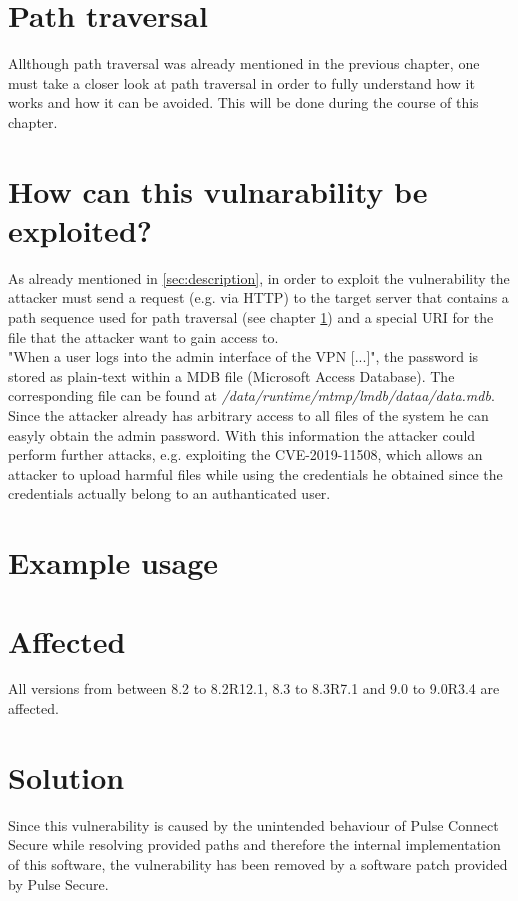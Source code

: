 \section{Path traversal}
\label{sec:path-traversal}
Allthough path traversal was already mentioned in the previous chapter, one must take a closer look at path traversal in order to fully understand how it works and how it can be avoided. This will be done during the course of this chapter.

\section{How can this vulnarability be exploited?}
\label{sec:exploitation}
As already mentioned in \ref{sec:description}, in order to exploit the vulnerability the attacker must send a request (e.g. via HTTP) to the target server that contains a path sequence used for path traversal (see chapter \ref{sec:path-traversal}) and a special URI for the file that the attacker want to gain access to.\autocite{Tenable2:online}\\
"When a user logs into the admin interface of the VPN [...]"\autocite{Tenable2:online}, the password is stored as plain-text within a MDB file (Microsoft Access Database). The corresponding file can be found at \textit{/data/runtime/mtmp/lmdb/dataa/data.mdb}. Since the attacker already has arbitrary access to all files of the system he can easyly obtain the admin password. With this information the attacker could perform further attacks, e.g. exploiting the CVE-2019-11508, which allows an attacker to upload harmful files while using the credentials he obtained since the credentials actually belong to an authanticated user.\autocite{Tenable2:online}

\section{Example usage}
\label{sec:example}

\section{Affected}
\label{sec:affected}
All versions from between 8.2 to 8.2R12.1, 8.3 to 8.3R7.1 and 9.0 to 9.0R3.4 are affected.\autocite{NVDCVE:online}

\section{Solution}
Since this vulnerability is caused by the unintended behaviour of Pulse Connect Secure while resolving provided paths and therefore the internal implementation of this software, the vulnerability has been removed by a software patch provided by Pulse Secure.